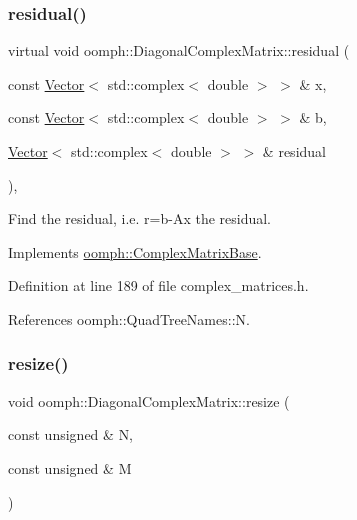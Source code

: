 \subsubsection{\texorpdfstring{residual()}{residual()}}
{\footnotesize\ttfamily virtual void oomph\+::\+Diagonal\+Complex\+Matrix\+::residual (\begin{DoxyParamCaption}\item[{const \hyperlink{classoomph_1_1Vector}{Vector}$<$ std\+::complex$<$ double $>$ $>$ \&}]{x,  }\item[{const \hyperlink{classoomph_1_1Vector}{Vector}$<$ std\+::complex$<$ double $>$ $>$ \&}]{b,  }\item[{\hyperlink{classoomph_1_1Vector}{Vector}$<$ std\+::complex$<$ double $>$ $>$ \&}]{residual }\end{DoxyParamCaption})\hspace{0.3cm}{\ttfamily [inline]}, {\ttfamily [virtual]}}



Find the residual, i.\+e. r=b-\/\+Ax the residual. 



Implements \hyperlink{classoomph_1_1ComplexMatrixBase_aec72875402b9ba387e0724d6c2597430}{oomph\+::\+Complex\+Matrix\+Base}.



Definition at line 189 of file complex\+\_\+matrices.\+h.



References oomph\+::\+Quad\+Tree\+Names\+::N.

\mbox{\label{classoomph_1_1DiagonalComplexMatrix_a35121313d09b76ef286893a7ce006b2e}} 
\subsubsection{\texorpdfstring{resize()}{resize()}\hspace{0.1cm}{\footnotesize\ttfamily [1/2]}}
{\footnotesize\ttfamily void oomph\+::\+Diagonal\+Complex\+Matrix\+::resize (\begin{DoxyParamCaption}\item[{const unsigned \&}]{N,  }\item[{const unsigned \&}]{M }\end{DoxyParamCaption})}




